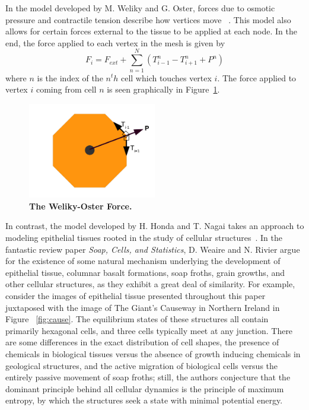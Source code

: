 In the model developed by M. Weliky and G. Oster, forces due to osmotic pressure and contractile tension describe how vertices move ~\cite{WO}. This model also allows for certain forces external to the tissue to be applied at each node. In the end, the force applied to each vertex in the mesh is given by
\begin{equation*}
F_i = F_{ext}+\sum\limits_{n=1}^N(T_{i-1}^n - T_{i+1}^n + P^n)
\end{equation*}
where $n$ is the index of the $n^th$ cell which touches vertex $i$. The force applied to vertex $i$ coming from cell $n$  is seen graphically in Figure~\ref{fig:WO}.
\begin{figure}[h]
\centering
\includegraphics[width=0.5\textwidth]{../diagrams/welikyoster.png}
\caption{\textbf{The Weliky-Oster Force.}}
\label{fig:WO}
\end{figure}

In contrast, the model developed by H. Honda and T. Nagai takes an approach to modeling epithelial tissues rooted in the study of cellular structures~\cite{VertDyn}.  In the fantastic review paper \emph{Soap, Cells, and Statistics}, D. Weaire and N. Rivier argue for the existence of some natural mechanism underlying the development of epithelial tissue, columnar basalt formations, soap froths, grain growths, and other cellular structures, as they exhibit a great deal of similarity. For example, consider the images of epithelial tissue presented throughout this paper juxtaposed with the image of The Giant's Causeway in Northern Ireland in Figure ~\ref{fig:cause}. The equilibrium states of these structures all contain primarily hexagonal cells, and three cells typically meet at any junction. There are some differences in the exact distribution of cell shapes, the presence of chemicals in biological tissues versus the absence of growth inducing chemicals in geological structures, and the active migration of biological cells versus the entirely passive movement of soap froths; still, the authors conjecture that the dominant principle behind all cellular dynamics is the principle of maximum entropy, by which the structures seek a state with minimal potential energy.

